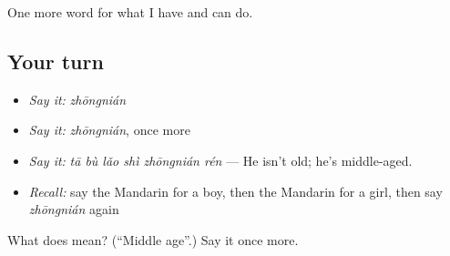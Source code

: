 \begin{grammarlens}[title={What you've built}]
One more word for what I have and can do.
\end{grammarlens}

\subsection*{Your turn}
\begin{itemize}
\raggedright
  \item \emph{Say it:} \emph{zhōngnián}
  \item \emph{Say it:} \emph{zhōngnián}, once more
  \item \emph{Say it:} \emph{tā bù lǎo shì zhōngnián rén} — He isn't old; he's middle-aged.
  \item \emph{Recall:} say the Mandarin for a boy, then the Mandarin for a girl, then say \emph{zhōngnián} again
\end{itemize}

\begin{tcolorbox}[breakable,colback=teal!4,colframe=teal!35!black,title={Before you move on}]
What does  mean? (\textquotedblleft{}Middle age\textquotedblright{}.) Say it once more.
\end{tcolorbox}
